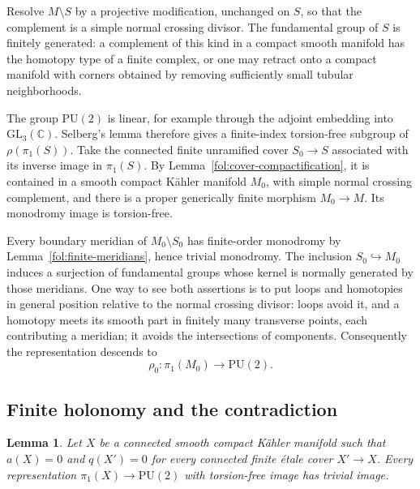 \documentclass[11pt,letterpaper]{article}
\newtheorem{lemma}[theorem]{Lemma}
\theoremstyle{definition}
\theoremstyle{remark}
\begin{document}
Resolve $M\setminus S$ by a projective modification, unchanged on $S$,
so that the complement is a simple normal crossing divisor.
The fundamental group of $S$ is finitely generated: a complement of
this kind in a compact smooth manifold has the homotopy type of a
finite complex, or one may retract onto a compact manifold with
corners obtained by removing sufficiently small tubular neighborhoods.

The group $\mathrm{PU}(2)$ is linear, for example through the adjoint
embedding into $\mathrm{GL}_3(\mathbb{C})$.  Selberg's lemma therefore gives
a finite-index torsion-free subgroup of $\rho(\pi_1(S))$.
Take the connected finite unramified cover $S_0\to S$ associated with
its inverse image in $\pi_1(S)$.  By
Lemma~\ref{fol:cover-compactification}, it is contained in a smooth
compact K\"ahler manifold $M_0$, with simple normal crossing
complement, and there is a proper generically finite morphism
$M_0\to M$.  Its monodromy image is torsion-free.

Every boundary meridian of $M_0\setminus S_0$ has finite-order
monodromy by Lemma~\ref{fol:finite-meridians}, hence trivial
monodromy.  The inclusion $S_0\hookrightarrow M_0$ induces a
surjection of fundamental groups whose kernel is normally generated
by those meridians.  One way to see both assertions is to put loops
and homotopies in general position relative to the normal crossing
divisor: loops avoid it, and a homotopy meets its smooth part in
finitely many transverse points, each contributing a meridian; it
avoids the intersections of components.  Consequently the
representation descends to
\begin{equation}\label{fol:compact-representation}
 \rho_0\colon\pi_1(M_0)\to\mathrm{PU}(2).
\end{equation}

\subsection{Finite holonomy and the contradiction}

\begin{lemma}\label{fol:finite-unitary-image}
Let $X$ be a connected smooth compact K\"ahler manifold such that
$a(X)=0$ and $q(X')=0$ for every connected finite \'etale cover
$X'\to X$.  Every representation
$\pi_1(X)\to\mathrm{PU}(2)$ with torsion-free image has trivial image.
\end{lemma}
\end{document}
